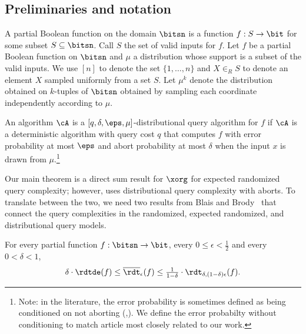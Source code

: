 \documentclass{toc}
\begin{document}
%
\subsection{Preliminaries and notation}   %

A partial Boolean function on the domain $\bitsn$ is a function
$f: S \rightarrow \bit$ for some subset $S \subseteq \bitsn$.  Call
$S$ the set of valid inputs for $f$.  Let $f$ be a partial Boolean
function on $\bitsn$ and $\mu$ a distribution whose support is a
subset of the valid inputs. %
%
%
%
%
%
%
%
%
%
%
We use $[n]$ to denote the set
$\{1,\ldots, n\}$ and $X \in_R S$ to denote an element $X$ sampled uniformly
from a set $S$.  Let $\mu^k$ denote the distribution obtained on
$k$-tuples of $\bitsn$ obtained by sampling each coordinate
independently according to $\mu$.

An algorithm $\cA$ is a $[q,\delta,\eps,\mu]$-distributional query
algorithm for $f$ if $\cA$ is a deterministic algorithm with query
cost $q$ that computes $f$ with error probability at most $\eps$ and
abort probability at most $\delta$ when the input $x$ is drawn from
$\mu$.\footnote{Note: in the literature, the error probability is
  sometimes defined as being conditioned on not aborting 
(\eg,\cite{BenDavidGKW20}).  We define
  the error probabilty without conditioning to match
%
article \cite{BlaisB19}   %
most closely related to our work.}

Our main theorem is a direct sum result for $\xorg$ for %
expected %
randomized query complexity; however,  uses
distributional query complexity with aborts.  To translate between the
two, we need two results from Blais and Brody~\cite{BlaisB19} that
connect the query complexities in the randomized, %
expected %
randomized, and distributional query models.

\begin{fact}
\label{fact:abort-average}
For every
partial %
function $f : \bitsn \to \bit$, every
$0 \le \epsilon < \frac12$ and every $0 < \delta < 1$,
\[
\delta \cdot \rdtde(f) \le \overline{\rdt}_\epsilon(f) \le \tfrac{1}{1-\delta}
\cdot \rdt_{\delta,(1-\delta)\epsilon}(f).
%
%
\]
\end{fact}
\end{document}
